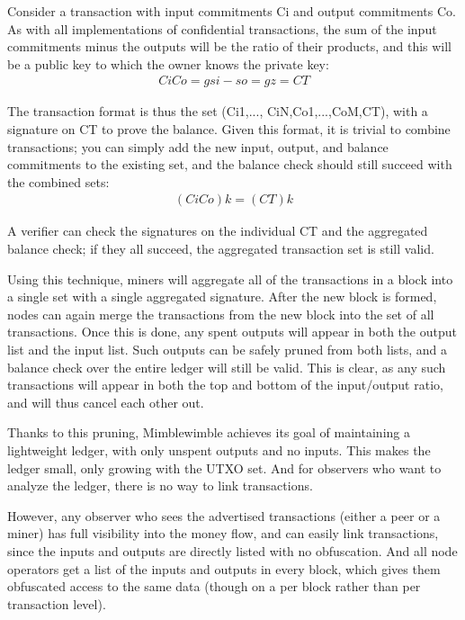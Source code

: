 \documentclass{article}
\begin{document}
Consider a transaction with input commitments Ci and output commitments Co.  As with all implementations of confidential transactions, the sum of the input commitments minus the outputs will be the ratio of their products, and this will be a public key to which the owner knows the private key:
\begin{eqnarray}
  Ci Co=g si -  so=gz=CT
\end{eqnarray}

The transaction format is thus the set (Ci1,..., CiN,Co1,...,CoM,CT), with a signature on CT to prove the balance.  Given this format, it is trivial to combine transactions; you can simply add the new input, output, and balance commitments to the existing set, and the balance check should still succeed with the combined sets:
\begin{eqnarray}
  (  Ci Co)k= (CT)k
\end{eqnarray}

A verifier can check the signatures on the individual CT and the aggregated balance check; if they all succeed, the aggregated transaction set is still valid.

Using this technique, miners will aggregate all of the transactions in a block into a single set with a single aggregated signature.  After the new block is formed, nodes can again merge the transactions from the new block into the set of all transactions.  Once this is done, any spent outputs will appear in both the output list and the input list.  Such outputs can be safely pruned from both lists, and a balance check over the entire ledger will still be valid.  This is clear, as any such transactions will appear in both the top and bottom of the input/output ratio, and will thus cancel each other out.  

Thanks to this pruning, Mimblewimble achieves its goal of maintaining a lightweight ledger, with only unspent outputs and no inputs.  This makes the ledger small, only growing with the UTXO set.  And for observers who want to analyze the ledger, there is no way to link transactions.

However, any observer who sees the advertised transactions (either a peer or a miner) has full visibility into the money flow, and can easily link transactions, since the inputs and outputs are directly listed with no obfuscation.  And all node operators get a list of the inputs and outputs in every block, which gives them obfuscated access to the same data (though on a per block rather than per transaction level).
\end{document}
